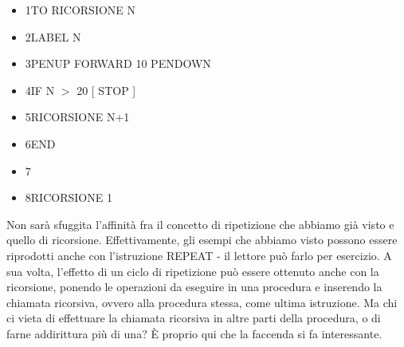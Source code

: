 \begin{table}[H]
\begin{minipage}{1.0\textwidth}
\begin{itemize}[itemsep=-3pt,parsep=2pt]
\item[] \hspace{0.5cm}  1\hspace{8pt}TO RICORSIONE N
\item[] \hspace{0.5cm}  2\hspace{8pt}\hspace{8pt}LABEL N
\item[] \hspace{0.5cm}  3\hspace{8pt}\hspace{8pt}PENUP FORWARD 10 PENDOWN
\item[] \hspace{0.5cm}	4\hspace{8pt}\hspace{8pt}IF N $>$ 20 [ STOP ]
\item[] \hspace{0.5cm}  5\hspace{8pt}\hspace{8pt}RICORSIONE N+1
\item[] \hspace{0.5cm}  6\hspace{8pt}END
\item[] \hspace{0.5cm}  7\hspace{8pt}
\item[] \hspace{0.5cm}  8\hspace{8pt}RICORSIONE 1                
\end{itemize}          	          
\end{minipage}
\end{table}

\vskip 1cm

Non sarà sfuggita l'affinità fra il concetto di ripetizione che abbiamo già visto e quello di ricorsione. Effettivamente, gli esempi che abbiamo visto possono essere riprodotti anche con l'istruzione REPEAT - il lettore può farlo per esercizio. A sua volta, l'effetto di un ciclo di ripetizione può essere ottenuto anche con la ricorsione, ponendo le operazioni da eseguire in una procedura e inserendo la chiamata ricorsiva, ovvero alla procedura stessa, come ultima istruzione. Ma chi ci vieta di effettuare la chiamata ricorsiva in altre parti della procedura, o di farne addirittura più di una? È proprio qui che la faccenda si fa interessante.

